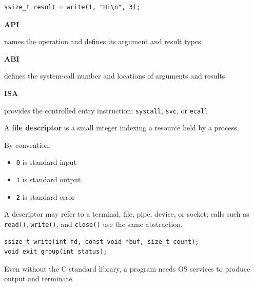 \begin{slide}


	\begin{verbatim}
ssize_t result = write(1, "Hi\n", 3);
	\end{verbatim}

	\textbf{API}

	\leftspace names the operation and defines its argument and result types

	\medskip

	\textbf{ABI}

	\leftspace defines the system-call number and locations of arguments and results

	\medskip

	\textbf{ISA}

	\leftspace provides the controlled entry instruction: \texttt{syscall}, \texttt{svc}, or \texttt{ecall}

\end{slide}

\begin{slide}


	A \textbf{file descriptor} is a small integer indexing a resource held by a process.

	\bigskip

	By convention:

	\begin{itemize}
		\item \texttt{0} is standard input
		\item \texttt{1} is standard output
		\item \texttt{2} is standard error
	\end{itemize}

	\bigskip

	A descriptor may refer to a terminal, file, pipe, device, or socket; calls such as \texttt{read()}, \texttt{write()}, and \texttt{close()} use the same abstraction.

\end{slide}

\begin{slide}


	\begin{verbatim}
ssize_t write(int fd, const void *buf, size_t count);
void exit_group(int status);
	\end{verbatim}


	\bigskip

	Even without the C standard library, a program needs OS services to produce output and terminate.

\end{slide}

